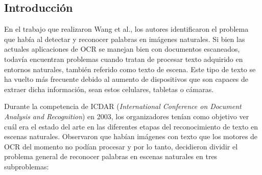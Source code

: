 \subsection{Introducción}

	En el trabajo que realizaron Wang et al., los autores identificaron el problema que había al detectar y reconocer palabras en imágenes naturales. Si bien las actuales aplicaciones de OCR se manejan bien con documentos escaneados, todavía encuentran problemas cuando tratan de procesar texto adquirido en entornos naturales, también referido como texto de escena. Este tipo de texto se ha vuelto más frecuente debido al aumento de dispositivos que son capaces de extraer dicha información, sean estos celulares, tabletas o cámaras.
	
	Durante la competencia de ICDAR (\textit{International Conference on Document Analysis and Recognition}) en 2003, los organizadores tenían como objetivo ver cuál era el estado del arte en las diferentes etapas del reconocimiento de texto en escenas naturales. Observaron que habían imágenes con texto que los motores de OCR del momento no podían procesar y por lo tanto, decidieron dividir el problema general de reconocer palabras en escenas naturales en tres subproblemas:
	
